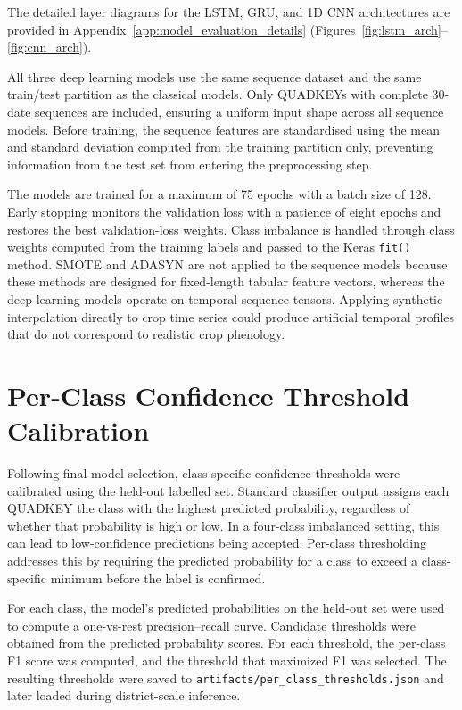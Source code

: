 The detailed layer diagrams for the LSTM, GRU, and 1D CNN architectures
are provided in Appendix~\ref{app:model_evaluation_details}
(Figures~\ref{fig:lstm_arch}--\ref{fig:cnn_arch}).

All three deep learning models use the same sequence dataset and the same
train/test partition as the classical models. Only QUADKEYs with complete
30-date sequences are included, ensuring a uniform input shape across all
sequence models. Before training, the sequence features are standardised
using the mean and standard deviation computed from the training partition
only, preventing information from the test set from entering the
preprocessing step.

The models are trained for a maximum of 75 epochs with a batch size of 128.
Early stopping monitors the validation loss with a patience of eight epochs
and restores the best validation-loss weights. Class imbalance is handled
through class weights computed from the training labels and passed to the
Keras \texttt{fit()} method. SMOTE and ADASYN are not applied to the sequence
models because these methods are designed for fixed-length tabular feature
vectors, whereas the deep learning models operate on temporal sequence
tensors. Applying synthetic interpolation directly to crop time series could
produce artificial temporal profiles that do not correspond to realistic crop
phenology.


\section{Per-Class Confidence Threshold Calibration}
\label{sec:thresholds}

Following final model selection, class-specific confidence thresholds were
calibrated using the held-out labelled set. Standard classifier output
assigns each QUADKEY the class with the highest predicted probability,
regardless of whether that probability is high or low. In a four-class
imbalanced setting, this can lead to low-confidence predictions being
accepted. Per-class thresholding addresses this by requiring the predicted
probability for a class to exceed a class-specific minimum before the label
is confirmed.

For each class, the model's predicted probabilities on the held-out set
were used to compute a one-vs-rest precision--recall curve. Candidate
thresholds were obtained from the predicted probability scores. For each
threshold, the per-class F1 score was computed, and the threshold that
maximized F1 was selected. The resulting thresholds were saved to
\texttt{artifacts/per\_class\_thresholds.json} and later loaded during
district-scale inference.


